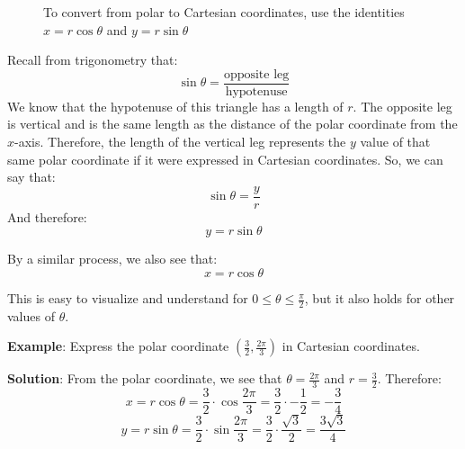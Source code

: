 \begin{figure}[htbp]
\centering
    \caption{To convert from polar to Cartesian coordinates, use the identities 
    $x = r\cos{\theta}$ and $y = r\sin{\theta}$}
    \label{fig:polar_to_cart}
    \end{figure}

Recall from trigonometry that:
$$\sin{\theta} = \frac{\text{opposite leg}}{\text{hypotenuse}}$$
We know that the hypotenuse of this triangle has a length of $r$. The opposite 
leg is vertical and is the same length as the distance of the polar coordinate 
from the $x$-axis. Therefore, the length of the vertical leg represents the 
$y$ value of that same polar coordinate if it were expressed in Cartesian 
coordinates. So, we can say that:
$$\sin{\theta} = \frac{y}{r}$$
And therefore:
$$y = r\sin{\theta}$$

By a similar process, we also see that:
$$x = r\cos{\theta}$$

This is easy to visualize and understand for $0 \leq \theta \leq \frac{\pi}{
2}$, but it also holds for other values of $\theta$. 

\textbf{Example}: Express the polar coordinate $(\frac{3}{2}, \frac{2\pi}{3})$ 
in Cartesian coordinates.

\textbf{Solution}: From the polar coordinate, we see that $\theta = \frac{2\pi
}{3}$ and $r = \frac{3}{2}$. Therefore:
$$x = r\cos{\theta} = \frac{3}{2} \cdot \cos{\frac{2\pi}{3}} = \frac{3}{2} 
\cdot -\frac{1}{2} = -\frac{3}{4}$$
$$y = r\sin{\theta} = \frac{3}{2} \cdot \sin{\frac{2\pi}{3}} = \frac{3}{2} 
\cdot \frac{\sqrt{3}}{2} = \frac{3\sqrt{3}}{4}$$


